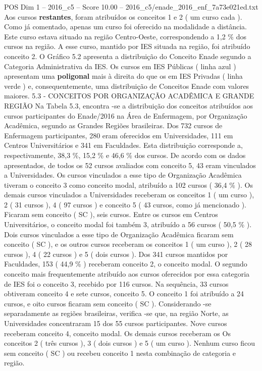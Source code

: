 \begin{textsample}{POS Dim 1 – 2016\_c5 – Score 10.00 – 2016\_c5/enade\_2016\_enf\_7a73e021ed.txt}
Aos cursos \textbf{restantes}, foram atribuídos os conceitos 1 e 2 ( um curso cada ).
Como já comentado, apenas um curso foi oferecido na modalidade a distância.
Este curso estava situado na região Centro-Oeste, correspondendo a 1,2 \% dos cursos na região.
A esse curso, mantido por IES situada na região, foi atribuído conceito 2.
O Gráfico 5.2 apresenta a distribuição do Conceito Enade segundo a Categoria Administrativa da IES.
Os cursos em IES Públicas ( linha azul ) apresentam uma \textbf{poligonal} mais à direita do que os em IES Privadas ( linha verde ) e, consequentemente, uma distribuição de Conceitos Enade com valores maiores. 5.3 - CONCEITOS POR ORGANIZAÇÃO ACADÊMICA E GRANDE REGIÃO Na Tabela 5.3, encontra -se a distribuição dos conceitos atribuídos aos cursos participantes do Enade/2016 na Área de Enfermagem, por Organização Acadêmica, segundo as Grandes Regiões brasileiras.
Dos 732 cursos de Enfermagem participantes, 280 eram oferecidos em Universidades, 111 em Centros Universitários e 341 em Faculdades.
Esta distribuição corresponde a, respectivamente, 38,3 \%, 15,2 \% e 46,6 \% dos cursos.
De acordo com os dados apresentados, de todos os 52 cursos avaliados com conceito 5, 43 eram vinculados a Universidades.
Os cursos vinculados a esse tipo de Organização Acadêmica tiveram o conceito 3 como conceito modal, atribuído a 102 cursos ( 36,4 \% ).
Os demais cursos vinculados a Universidades receberam os conceitos 1 ( um curso ), 2 ( 31 cursos ), 4 ( 97 cursos ) e conceito 5 ( 43 cursos, como já mencionado ).
Ficaram sem conceito ( SC ), seis cursos.
Entre os cursos em Centros Universitários, o conceito modal foi também 3, atribuído a 56 cursos ( 50,5 \% ).
Dois cursos vinculados a esse tipo de Organização Acadêmica ficaram sem conceito ( SC ), e os outros cursos receberam os conceitos 1 ( um curso ), 2 ( 28 cursos ), 4 ( 22 cursos ) e 5 ( dois cursos ).
Dos 341 cursos mantidos por Faculdades, 153 ( 44,9 \% ) receberam conceito 2, o conceito modal.
O segundo conceito mais frequentemente atribuído aos cursos oferecidos por essa categoria de IES foi o conceito 3, recebido por 116 cursos.
Na sequência, 33 cursos obtiveram conceito 4 e sete cursos, conceito 5.
O conceito 1 foi atribuído a 24 cursos, e oito cursos ficaram sem conceito ( SC ).
Considerando -se separadamente as regiões brasileiras, verifica -se que, na região Norte, as Universidades concentraram 15 dos 55 cursos participantes.
Nove cursos receberam conceito 4, conceito modal.
Os demais cursos receberam os Os conceitos 2 ( três cursos ), 3 ( dois cursos ) e 5 ( um curso ).
Nenhum curso ficou sem conceito ( SC ) ou recebeu conceito 1 nesta combinação de categoria e região.

\end{textsample}

